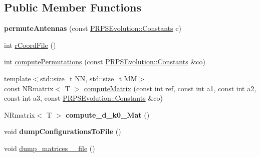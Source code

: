 \subsection*{Public Member Functions}
\begin{DoxyCompactItemize}
\item 
\hypertarget{struct_p_r_p_s_evolution_1_1_permutate_1_1permute_antennas_a68fefa5568ab6e69f07e70e9c14645f7}{{\bfseries permute\-Antennas} (const \hyperlink{struct_p_r_p_s_evolution_1_1_constants}{P\-R\-P\-S\-Evolution\-::\-Constants} c)}\label{struct_p_r_p_s_evolution_1_1_permutate_1_1permute_antennas_a68fefa5568ab6e69f07e70e9c14645f7}

\item 
int \hyperlink{struct_p_r_p_s_evolution_1_1_permutate_1_1permute_antennas_a0047bdfca507e76d1e19b9303d295fa0}{r\-Coord\-File} ()
\item 
int \hyperlink{struct_p_r_p_s_evolution_1_1_permutate_1_1permute_antennas_a440bc6e938ae87959dc4453637246cb6}{compute\-Permutations} (const \hyperlink{struct_p_r_p_s_evolution_1_1_constants}{P\-R\-P\-S\-Evolution\-::\-Constants} \&co)
\item 
{\footnotesize template$<$std\-::size\-\_\-t N\-N, std\-::size\-\_\-t M\-M$>$ }\\const N\-Rmatrix$<$ T $>$ \hyperlink{struct_p_r_p_s_evolution_1_1_permutate_1_1permute_antennas_a74e6a08269a63447819fc57b06550f27}{compute\-Matrix} (const int ref, const int a1, const int a2, const int a3, const \hyperlink{struct_p_r_p_s_evolution_1_1_constants}{P\-R\-P\-S\-Evolution\-::\-Constants} \&co)
\item 
\hypertarget{struct_p_r_p_s_evolution_1_1_permutate_1_1permute_antennas_a23dacd34ff43f2a382e2feab2b7c25ad}{N\-Rmatrix$<$ T $>$ {\bfseries compute\-\_\-d\-\_\-k0\-\_\-\-Mat} ()}\label{struct_p_r_p_s_evolution_1_1_permutate_1_1permute_antennas_a23dacd34ff43f2a382e2feab2b7c25ad}

\item 
\hypertarget{struct_p_r_p_s_evolution_1_1_permutate_1_1permute_antennas_a978cc54f7590fbf3c703eb27151e2868}{void {\bfseries dump\-Configurations\-To\-File} ()}\label{struct_p_r_p_s_evolution_1_1_permutate_1_1permute_antennas_a978cc54f7590fbf3c703eb27151e2868}

\item 
void \hyperlink{struct_p_r_p_s_evolution_1_1_permutate_1_1permute_antennas_a4b9b2a07d7ecf49fd901c9df1a811af6}{dump\-\_\-matrices\-\_\-\_\-file} ()
\end{DoxyCompactItemize}
